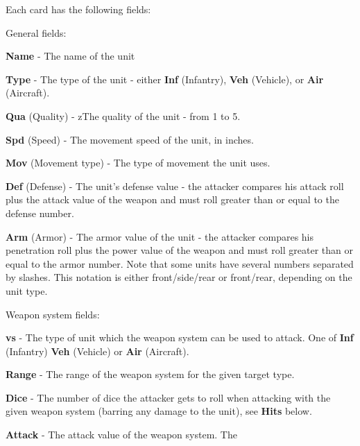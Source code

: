 \documentclass[12pt,titlepage]{article}
\begin{document}
  \begin{multicols}{2}

    Each card has the following fields:

    \begin{description}
    \item General fields:
      \begin{description}
        \item{\bf Name} - The name of the unit
        \item{\bf Type} - The type of the unit - either {\bf Inf}
          (Infantry), {\bf Veh} (Vehicle), or {\bf Air} (Aircraft).
        \item {\bf Qua} (Quality) - zThe quality of the unit - from 1
          to 5.
        \item {\bf Spd} (Speed) - The movement speed of the unit, in
          inches.
        \item {\bf Mov} (Movement type) - The type of movement the
          unit uses.
        \item {\bf Def} (Defense) - The unit's defense value - the
          attacker compares his attack roll plus the attack value of the
          weapon and must roll greater than or equal to the defense
          number.
        \item {\bf Arm} (Armor) - The armor value of the unit - the
          attacker compares his penetration roll plus the power value
          of the weapon and must roll greater than or equal to the armor
          number. Note that some units have several numbers separated by
          slashes. This notation is either front/side/rear or
          front/rear, depending on the unit type.
      \end{description}
    \item Weapon system fields:
      \begin{description}
      \item {\bf vs} - The type of unit which the weapon system can be
        used to attack. One of {\bf Inf} (Infantry) {\bf Veh}
        (Vehicle) or {\bf Air} (Aircraft).
      \item {\bf Range} - The range of the weapon system for the given
        target type.
      \item {\bf Dice} - The number of dice the attacker gets to roll
        when attacking with the given weapon system (barring any
        damage to the unit), see {\bf Hits} below. 
      \item {\bf Attack} - The attack value of the weapon system. The

\end{description}
\end{description}
\end{multicols}
\end{document}
